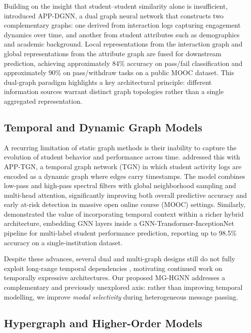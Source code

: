 \documentclass[sigconf]{acmart}
\begin{document}
Building on the insight that student--student similarity alone is insufficient,
\citet{huang2024dual} introduced APP-DGNN, a dual graph neural network that
constructs two complementary graphs: one derived from interaction logs capturing
engagement dynamics over time, and another from student attributes such as
demographics and academic background. Local representations from the interaction
graph and global representations from the attribute graph are fused for
downstream prediction, achieving approximately 84\% accuracy on pass/fail
classification and approximately 90\% on pass/withdraw tasks on a public MOOC
dataset. This dual-graph paradigm highlights a key architectural principle:
different information sources warrant distinct graph topologies rather than a
single aggregated representation.

\subsection{Temporal and Dynamic Graph Models}

A recurring limitation of static graph methods is their inability to capture the
evolution of student behavior and performance across time. \citet{huang2024temporal}
addressed this with APP-TGN, a temporal graph network (TGN) in which student
activity logs are encoded as a dynamic graph where edges carry timestamps. The
model combines low-pass and high-pass spectral filters with global neighborhood
sampling and multi-head attention, significantly improving both overall predictive
accuracy and early at-risk detection in massive open online course (MOOC)
settings. Similarly, \citet{zhang2025gnntinet} demonstrated the value of
incorporating temporal context within a richer hybrid architecture, embedding GNN
layers inside a GNN-Transformer-InceptionNet pipeline for multi-label student
performance prediction, reporting up to 98.5\% accuracy on a single-institution
dataset.

Despite these advances, several dual and multi-graph designs still do not fully
exploit long-range temporal dependencies \citep{huang2024dual, huang2024temporal,
balachandar2024mspp}, motivating continued work on temporally expressive
architectures. Our proposed MG-HGNN addresses a complementary and previously
unexplored axis: rather than improving temporal modelling, we improve
\emph{modal selectivity} during heterogeneous message passing.

\subsection{Hypergraph and Higher-Order Models}
\end{document}
